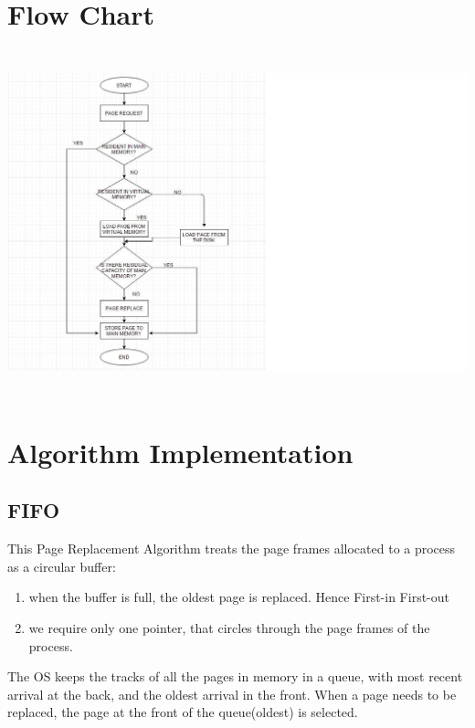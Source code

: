\documentclass[12pt]{article}
\begin{document}
	\section{Flow Chart}
	\includegraphics[height=10cm]{FlowChart.png}
	
		
		
		
	\section{Algorithm Implementation}
	\subsection{FIFO}
	This Page Replacement Algorithm treats the page frames allocated to a process as a circular buffer:
	\begin{enumerate}
		\item when the buffer is full, the oldest page is replaced. Hence First-in First-out
		\item we require only one pointer, that circles through the page frames of the process.
	\end{enumerate}
	The OS keeps the tracks of all the pages in memory in a queue, with most recent arrival at the back, and the oldest arrival in the front.
	When a page needs to be replaced, the page at the front of the queue(oldest) is selected.
\end{document}
